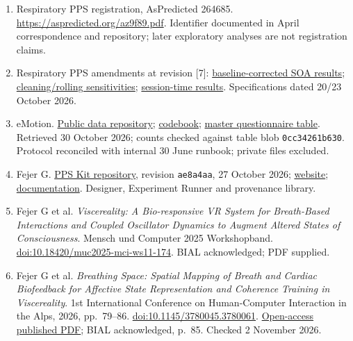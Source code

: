 \begin{enumerate}
\item Respiratory PPS registration, AsPredicted 264685. \url{https://aspredicted.org/az9f89.pdf}. Identifier documented in April correspondence and repository; later exploratory analyses are not registration claims.
\item Respiratory PPS amendments at revision [7]: \href{https://github.com/GeorgeFejer91/Respiratory-Modulation-of-Peripersonal-Space-Representation/blob/c8f0e6df29df86a3e82013ef25432e2435c6d4d8/results/pps_soa/RESULTS.md}{baseline-corrected SOA results}; \href{https://github.com/GeorgeFejer91/Respiratory-Modulation-of-Peripersonal-Space-Representation/blob/c8f0e6df29df86a3e82013ef25432e2435c6d4d8/results/trial_cleaning/RESULTS.md}{cleaning/rolling sensitivities}; \href{https://github.com/GeorgeFejer91/Respiratory-Modulation-of-Peripersonal-Space-Representation/blob/c8f0e6df29df86a3e82013ef25432e2435c6d4d8/results/trial_cleaning/SESSION_RESULTS.md}{session-time results}. Specifications dated 20/23 October 2026.
\item eMotion. \href{https://github.com/GeorgeFejer91/emotion-vr-data}{Public data repository}; \href{https://github.com/GeorgeFejer91/emotion-vr-data/blob/main/docs/condition_variable_code_sheet.csv}{codebook}; \href{https://github.com/GeorgeFejer91/emotion-vr-data/blob/main/data/participant-datasets-by-catalog/master_participant_psychometrics.csv}{master questionnaire table}. Retrieved 30 October 2026; counts checked against table blob \texttt{0cc34261b630}. Protocol reconciled with internal 30 June runbook; private files excluded.
\item Fejer G. \href{https://github.com/GeorgeFejer91/pps-kit}{PPS Kit repository}, revision \texttt{ae8a4aa}, 27 October 2026; \href{https://ppskit.qzz.io/}{website}; \href{https://ppskit.qzz.io/documentation/}{documentation}. Designer, Experiment Runner and provenance library.
\item Fejer G et al. \emph{Viscereality: A Bio-responsive VR System for Breath-Based Interactions and Coupled Oscillator Dynamics to Augment Altered States of Consciousness}. Mensch und Computer 2025 Workshopband. \href{https://doi.org/10.18420/muc2025-mci-ws11-174}{doi:10.18420/muc2025-mci-ws11-174}. BIAL acknowledged; PDF supplied.
\item Fejer G et al. \emph{Breathing Space: Spatial Mapping of Breath and Cardiac Biofeedback for Affective State Representation and Coherence Training in Viscereality}. 1st International Conference on Human-Computer Interaction in the Alps, 2026, pp.~79--86. \href{https://doi.org/10.1145/3780045.3780061}{doi:10.1145/3780045.3780061}. \href{https://www.hsbi.de/publikationsserver/download/7162/7163/3780045.3780061.pdf}{Open-access published PDF}; BIAL acknowledged, p.~85. Checked 2 November 2026.

\end{enumerate}
